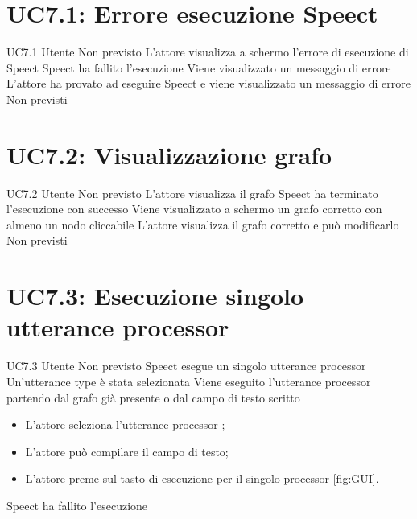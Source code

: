 \documentclass[../AnalisideiRequisiti.tex]{subfiles}
\begin{document}
\section{UC7.1: Errore esecuzione Speect}
\UserCase
{UC7.1}
{Utente}
{Non previsto}
{L'attore visualizza a schermo l'errore di esecuzione di Speect}
{Speect ha fallito l'esecuzione}
{Viene visualizzato un messaggio di errore}
{L'attore ha provato ad eseguire Speect e viene visualizzato un messaggio di errore}
{Non previsti}

\section{UC7.2: Visualizzazione grafo}
\UserCase
{UC7.2}
{Utente}
{Non previsto}
{L'attore visualizza il grafo}
{Speect ha terminato l'esecuzione con successo }
{Viene visualizzato a schermo un grafo corretto con almeno un nodo cliccabile}
{
	L'attore visualizza il grafo corretto e può modificarlo 
}
{Non previsti}

\section{UC7.3: Esecuzione singolo utterance processor}
\UserCase
{UC7.3}
{Utente}
{Non previsto}
{Speect esegue un singolo utterance processor}
{Un'utterance type è stata selezionata  }
{Viene eseguito l'utterance processor partendo dal grafo già presente o dal campo di testo scritto}
{
	\begin{itemize}
		\item{} L'attore seleziona l'utterance processor ;
		\item{} L'attore può compilare il campo di testo;
		\item{} L'attore preme sul tasto di esecuzione per il singolo processor \ref{fig:GUI}.
	\end{itemize}
}
{Speect ha fallito l'esecuzione}
\end{document}
